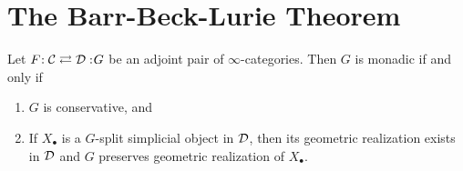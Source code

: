 

\clearpage







\section{The Barr-Beck-Lurie Theorem}
\begin{theorem}
\label{Barr-Beck-Lurie theorem}
	 \cite[Theorem 4.7.3.5.]{HA}
	Let $F\negmedspace: {\mathcal{C}}\rightleftarrows {\mathcal{D}}:\negmedspace G$ be an adjoint pair of $\infty$-categories. Then $G$ is monadic if and only if 
	\begin{enumerate}
		\item $G$ is conservative, and
		\item If $X_\bullet$ is a $G$-split simplicial object in ${\mathcal{D}}$, then its geometric realization exists in ${\mathcal{D}}$ and $G$ preserves geometric realization of $X_{\bullet}$.
	\end{enumerate}
\end{theorem}

